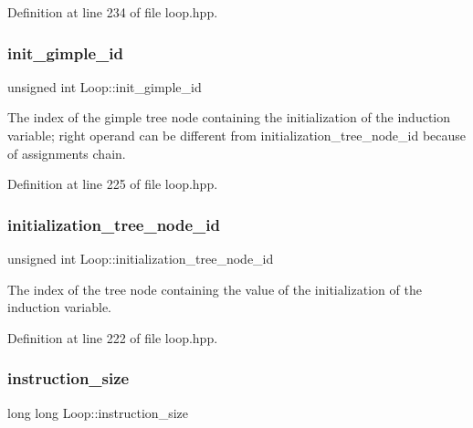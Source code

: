 Definition at line 234 of file loop.\+hpp.

\mbox{\label{classLoop_aebbecc85e705c40125f6ed400e233d1e}} 
\subsubsection{\texorpdfstring{init\+\_\+gimple\+\_\+id}{init\_gimple\_id}}
{\footnotesize\ttfamily unsigned int Loop\+::init\+\_\+gimple\+\_\+id}



The index of the gimple tree node containing the initialization of the induction variable; right operand can be different from initialization\+\_\+tree\+\_\+node\+\_\+id because of assignments chain. 



Definition at line 225 of file loop.\+hpp.

\mbox{\label{classLoop_a16e71b2baa9aad702a0ae748b2d6a5c3}} 
\subsubsection{\texorpdfstring{initialization\+\_\+tree\+\_\+node\+\_\+id}{initialization\_tree\_node\_id}}
{\footnotesize\ttfamily unsigned int Loop\+::initialization\+\_\+tree\+\_\+node\+\_\+id}



The index of the tree node containing the value of the initialization of the induction variable. 



Definition at line 222 of file loop.\+hpp.

\mbox{\label{classLoop_ab23c3fe7f84394f044732bcfb4974c7e}} 
\subsubsection{\texorpdfstring{instruction\+\_\+size}{instruction\_size}}
{\footnotesize\ttfamily long long Loop\+::instruction\+\_\+size}



